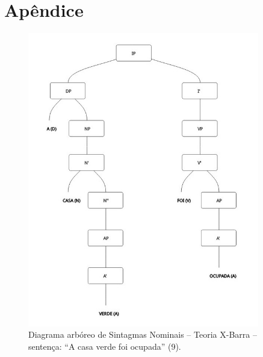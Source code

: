 \documentclass[portuguese]{textolivre}
\begin{document}
\section{Apêndice}\label{sec-apendice}
\begin{figure}[h]
 \centering
 \includegraphics[width=0.9\textwidth,height=0.8\textheight,keepaspectratio]{Fig3.png}
 \caption{Diagrama arbóreo de Sintagmas Nominais – Teoria X-Barra – sentença: “A casa verde foi ocupada” (9).}
 \label{fig3}
\end{figure}
\end{document}
